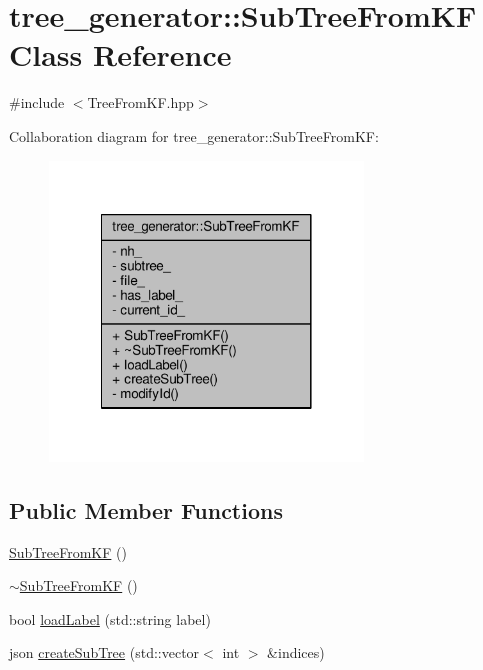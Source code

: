 \hypertarget{classtree__generator_1_1SubTreeFromKF}{\section{tree\-\_\-generator\-:\-:Sub\-Tree\-From\-K\-F Class Reference}
\label{classtree__generator_1_1SubTreeFromKF}
}


{\ttfamily \#include $<$Tree\-From\-K\-F.\-hpp$>$}



Collaboration diagram for tree\-\_\-generator\-:\-:Sub\-Tree\-From\-K\-F\-:
\nopagebreak
\begin{figure}[H]
\begin{center}
\leavevmode
\includegraphics[width=236pt]{de/d5a/classtree__generator_1_1SubTreeFromKF__coll__graph}
\end{center}
\end{figure}
\subsection*{Public Member Functions}
\begin{DoxyCompactItemize}
\item 
\hyperlink{classtree__generator_1_1SubTreeFromKF_ab7af1f33766b79ffb8d596db12a567f4_ab7af1f33766b79ffb8d596db12a567f4}{Sub\-Tree\-From\-K\-F} ()
\item 
\hyperlink{classtree__generator_1_1SubTreeFromKF_aa6f44a5c131577ea1719a3fa3a28d65d_aa6f44a5c131577ea1719a3fa3a28d65d}{$\sim$\-Sub\-Tree\-From\-K\-F} ()
\item 
bool \hyperlink{classtree__generator_1_1SubTreeFromKF_a3e4e089333af3305e40434e49dcc0878_a3e4e089333af3305e40434e49dcc0878}{load\-Label} (std\-::string label)
\item 
json \hyperlink{classtree__generator_1_1SubTreeFromKF_a531cc034d2af6a380a40763894542760_a531cc034d2af6a380a40763894542760}{create\-Sub\-Tree} (std\-::vector$<$ int $>$ \&indices)
\end{DoxyCompactItemize}
